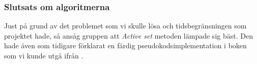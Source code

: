\subsubsection{Slutsats om algoritmerna}
Just på grund av det problemet som vi skulle lösa och tidsbegränsningen som projektet hade, så ansåg gruppen att \emph{Active set} metoden lämpade sig bäst. Den hade även som tidigare förklarat en färdig pseudokodsimplementation i boken som vi kunde utgå ifrån .

